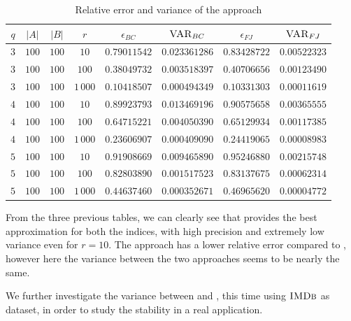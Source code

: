 \begin{table}[ht]
	\centering
	\begin{tabular}{|c|c|c|c|c|c|c|c|}
		\hline
		$q$ & $|A|$ & $|B|$ & $r$      & $\epsilon_{BC}$ & $\textsc{VAR}_{BC}$ & $\epsilon_{FJ}$ & $\textsc{VAR}_{FJ}$ \\ \hline \hline
		$3$ & $100$ & $100$ & $10$     & $0.79011542$    & $0.023361286$       & $0.83428722$    & $0.00522323$        \\ \hline
		$3$ & $100$ & $100$ & $100$    & $0.38049732$    & $0.003518397$       & $0.40706656$    & $0.00123490$        \\ \hline
		$3$ & $100$ & $100$ & $1\,000$ & $0.10418507$    & $0.000494349$       & $0.10331303$    & $0.00011619$        \\ \hline \hline
		$4$ & $100$ & $100$ & $10$     & $0.89923793$    & $0.013469196$       & $0.90575658$    & $0.00365555$        \\ \hline
		$4$ & $100$ & $100$ & $100$    & $0.64715221$    & $0.004050390$       & $0.65129934$    & $0.00117385$        \\ \hline
		$4$ & $100$ & $100$ & $1\,000$ & $0.23606907$    & $0.000409090$       & $0.24419065$    & $0.00008983$        \\ \hline \hline
		$5$ & $100$ & $100$ & $10$     & $0.91908669$    & $0.009465890$       & $0.95246880$    & $0.00215748$        \\ \hline
		$5$ & $100$ & $100$ & $100$    & $0.82803890$    & $0.001517523$       & $0.83137675$    & $0.00062314$        \\ \hline
		$5$ & $100$ & $100$ & $1\,000$ & $0.44637460$    & $0.000352671$       & $0.46965620$    & $0.00004772$        \\ \hline
	\end{tabular}
	\caption{Relative error and variance of the \base approach}	
\end{table}

\clearpage

From the three previous tables, we can clearly see that \fcount provides the best approximation for both the indices, 
with high precision and extremely low variance even for $r=10$. 
The \fsamp approach has a lower relative error compared to \base, however here the variance between the two approaches seems to be nearly the same.\medskip

We further investigate the variance between \fsamp and \base, this time using $\textsc{IMDb}$ as dataset,
in order to study the stability in a real application.

